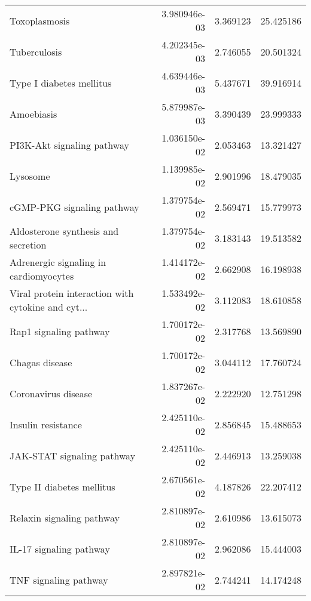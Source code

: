 \begin{tabular}{lrrr}
                                     Toxoplasmosis &      3.980946e-03 &  3.369123 &       25.425186 \\
                                      Tuberculosis &      4.202345e-03 &  2.746055 &       20.501324 \\
                          Type I diabetes mellitus &      4.639446e-03 &  5.437671 &       39.916914 \\
                                        Amoebiasis &      5.879987e-03 &  3.390439 &       23.999333 \\
                        PI3K-Akt signaling pathway &      1.036150e-02 &  2.053463 &       13.321427 \\
                                          Lysosome &      1.139985e-02 &  2.901996 &       18.479035 \\
                        cGMP-PKG signaling pathway &      1.379754e-02 &  2.569471 &       15.779973 \\
               Aldosterone synthesis and secretion &      1.379754e-02 &  3.183143 &       19.513582 \\
            Adrenergic signaling in cardiomyocytes &      1.414172e-02 &  2.662908 &       16.198938 \\
Viral protein interaction with cytokine and cyt... &      1.533492e-02 &  3.112083 &       18.610858 \\
                            Rap1 signaling pathway &      1.700172e-02 &  2.317768 &       13.569890 \\
                                    Chagas disease &      1.700172e-02 &  3.044112 &       17.760724 \\
                               Coronavirus disease &      1.837267e-02 &  2.222920 &       12.751298 \\
                                Insulin resistance &      2.425110e-02 &  2.856845 &       15.488653 \\
                        JAK-STAT signaling pathway &      2.425110e-02 &  2.446913 &       13.259038 \\
                         Type II diabetes mellitus &      2.670561e-02 &  4.187826 &       22.207412 \\
                         Relaxin signaling pathway &      2.810897e-02 &  2.610986 &       13.615073 \\
                           IL-17 signaling pathway &      2.810897e-02 &  2.962086 &       15.444003 \\
                             TNF signaling pathway &      2.897821e-02 &  2.744241 &       14.174248 \\

\end{tabular}
